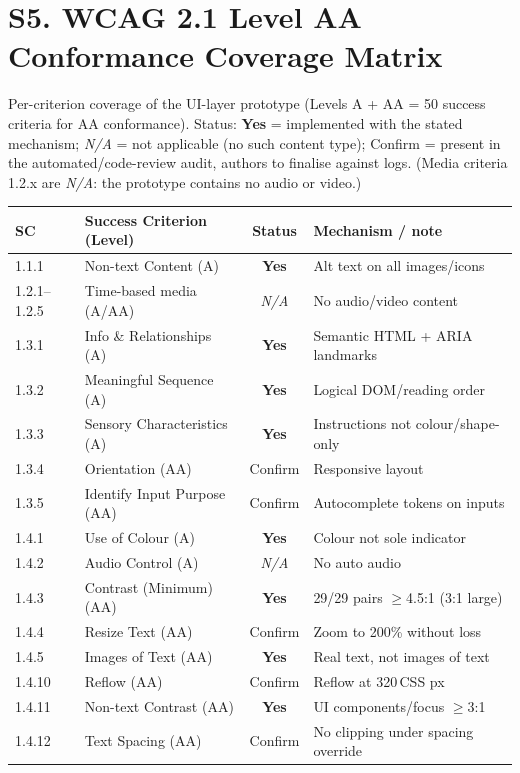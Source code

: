 \documentclass[10pt]{article}
\newcommand{\yes}{\textcolor{green!55!black}{\textbf{Yes}}}
\newcommand{\na}{\textit{N/A}}
\newcommand{\conf}{\textcolor{orange!80!black}{Confirm}}
\begin{document}
\section*{S5. WCAG 2.1 Level AA Conformance Coverage Matrix}
Per-criterion coverage of the UI-layer prototype (Levels A + AA = 50 success criteria for AA conformance).
Status: \yes{} = implemented with the stated mechanism; \na{} = not applicable (no such content type);
\conf{} = present in the automated/code-review audit, authors to finalise against logs.
{\footnotesize (Media criteria 1.2.x are \na: the prototype contains no audio or video.)}
\begin{center}\footnotesize
\begin{longtable}{|l|p{5.3cm}|c|p{4.2cm}|}
\hline\textbf{SC} & \textbf{Success Criterion (Level)} & \textbf{Status} & \textbf{Mechanism / note}\\\hline\endhead
1.1.1 & Non-text Content (A) & \yes & Alt text on all images/icons\\\hline
1.2.1--1.2.5 & Time-based media (A/AA) & \na & No audio/video content\\\hline
1.3.1 & Info \& Relationships (A) & \yes & Semantic HTML + ARIA landmarks\\\hline
1.3.2 & Meaningful Sequence (A) & \yes & Logical DOM/reading order\\\hline
1.3.3 & Sensory Characteristics (A) & \yes & Instructions not colour/shape-only\\\hline
1.3.4 & Orientation (AA) & \conf & Responsive layout\\\hline
1.3.5 & Identify Input Purpose (AA) & \conf & Autocomplete tokens on inputs\\\hline
1.4.1 & Use of Colour (A) & \yes & Colour not sole indicator\\\hline
1.4.2 & Audio Control (A) & \na & No auto audio\\\hline
1.4.3 & Contrast (Minimum) (AA) & \yes & 29/29 pairs $\geq$4.5:1 (3:1 large)\\\hline
1.4.4 & Resize Text (AA) & \conf & Zoom to 200\% without loss\\\hline
1.4.5 & Images of Text (AA) & \yes & Real text, not images of text\\\hline
1.4.10 & Reflow (AA) & \conf & Reflow at 320\,CSS px\\\hline
1.4.11 & Non-text Contrast (AA) & \yes & UI components/focus $\geq$3:1\\\hline
1.4.12 & Text Spacing (AA) & \conf & No clipping under spacing override\\\hline

\end{longtable}
\end{center}
\end{document}
